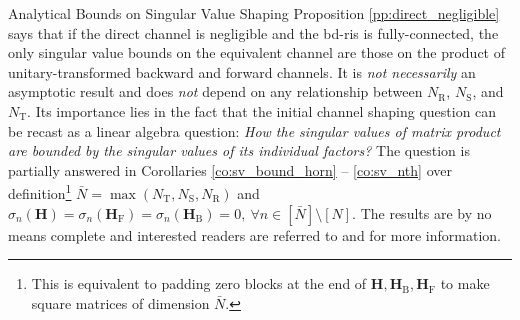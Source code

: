\begin{section}{Analytical Bounds on Singular Value Shaping}
	Proposition \ref{pp:direct_negligible} says that if the direct channel is negligible and the \gls{bd}-\gls{ris} is fully-connected, the only singular value bounds on the equivalent channel are those on the product of unitary-transformed backward and forward channels.
	It is \emph{not necessarily} an asymptotic result and does \emph{not} depend on any relationship between $N_\mathrm{R}$, $N_\mathrm{S}$, and $N_\mathrm{T}$.
	Its importance lies in the fact that the initial channel shaping question can be recast as a linear algebra question: \emph{How the singular values of matrix product are bounded by the singular values of its individual factors?}
	The question is partially answered in Corollaries \ref{co:sv_bound_horn} -- \ref{co:sv_nth} over definition\footnote{This is equivalent to padding zero blocks at the end of $\mathbf{H}, \mathbf{H}_\mathrm{B}, \mathbf{H}_\mathrm{F}$ to make square matrices of dimension $\bar{N}$.} $\bar{N} = \max(N_\mathrm{T},N_\mathrm{S},N_\mathrm{R})$ and $\sigma_n(\mathbf{H})=\sigma_n(\mathbf{H}_\mathrm{F})=\sigma_n(\mathbf{H}_\mathrm{B})=0, \ \forall n \in [\bar{N}] \setminus [N]$.
	The results are by no means complete and interested readers are referred to \cite[Chapter 16, 24]{Hogben2013} and \cite[Chapter 3]{Horn1994} for more information.



\end{section}
